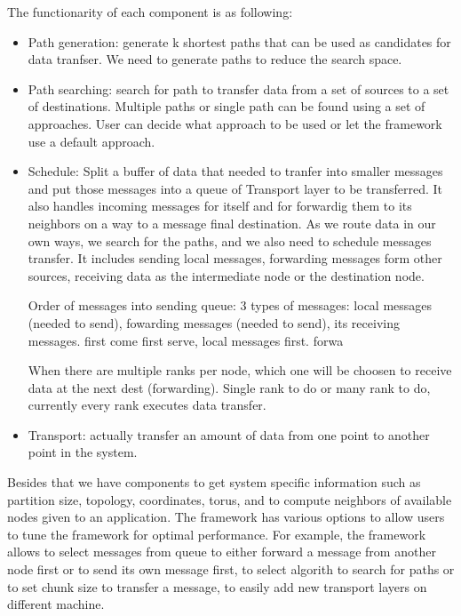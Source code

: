 The functionarity of each component is as following:
\begin{itemize}
\item Path generation: generate k shortest paths that can be used as candidates for data tranfser. We need to generate paths to reduce the search space.
\item Path searching: search for path to transfer data from a set of sources to a set of destinations. Multiple paths or single path can be found using a set of approaches. User can decide what approach to be used or let the framework use a default approach.
\item Schedule: Split a buffer of data that needed to tranfer into smaller messages and put those messages into a queue of Transport layer to be transferred. It also handles incoming messages for itself and for forwardig them to its neighbors on a way to a message final destination.
As we route data in our own ways, we search for the paths, and we also need to schedule messages transfer. It includes sending local messages, forwarding messages form other sources, receiving data as the intermediate node or the destination node.

Order of messages into sending queue: 3 types of messages: local messages (needed to send), fowarding messages (needed to send), its receiving messages. first come first serve, local messages first. forwa

When there are multiple ranks per node, which one will be choosen to receive data at the next dest (forwarding). Single rank to do or many rank to do, currently every rank executes data transfer.

\item Transport: actually transfer an amount of data from one point to another point in the system.

\end{itemize}

Besides that we have components to get system specific information such as partition size, topology, coordinates, torus, and to compute neighbors of available nodes given to an application. The framework has various options to allow users to tune the framework for optimal performance. For example, the framework allows to select messages from queue to either forward a message from another node first or to send its own message first, to select algorith to search for paths or to set chunk size to transfer a message, to easily add new transport layers on different machine.
